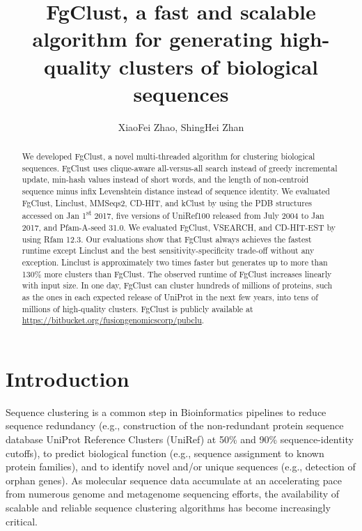 \documentclass[11pt,letterpaper]{article}
\title{FgClust, a fast and scalable algorithm for generating high-quality clusters of biological sequences}
\author{XiaoFei Zhao, ShingHei Zhan}
\begin{document}
\maketitle

\begin{abstract}
We developed FgClust, a novel multi-threaded algorithm for clustering biological sequences.
FgClust uses clique-aware all-versus-all search instead of greedy incremental update, min-hash values instead of short words, and the length of non-centroid sequence minus infix Levenshtein distance instead of sequence identity.
We evaluated FgClust, Linclust, MMSeqs2, CD-HIT, and kClust by using the PDB structures accessed on Jan 1\textsuperscript{st} 2017, five versions of UniRef100 released from July 2004 to Jan 2017, and Pfam-A-seed 31.0.
We evaluated FgClust, VSEARCH, and CD-HIT-EST by using Rfam 12.3.
Our evaluations show that FgClust always achieves the fastest runtime except Linclust and the best sensitivity-specificity trade-off without any exception.
Linclust is approximately two times faster but generates up to more than 130\% more clusters than FgClust.
The observed runtime of FgClust increases linearly with input size.
In one day, FgClust can cluster hundreds of millions of proteins, such as the ones in each expected release of UniProt in the next few years, into tens of millions of high-quality clusters.
FgClust is publicly available at \url{https://bitbucket.org/fusiongenomicscorp/pubclu}.
\end{abstract}

\section{Introduction}

Sequence clustering is a common step in Bioinformatics pipelines to reduce sequence redundancy (e.g., construction of the non-redundant protein sequence database UniProt Reference Clusters (UniRef) at 50\% and 90\% sequence-identity cutoffs), to predict biological function (e.g., sequence assignment to known protein families), and to identify novel and/or unique sequences (e.g., detection of orphan genes). As molecular sequence data accumulate at an accelerating pace from numerous genome and metagenome sequencing efforts, the availability of scalable and reliable sequence clustering algorithms has become increasingly critical.

\end{document}

